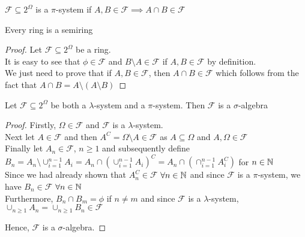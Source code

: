 \begin{definition}[$\pi$-system]
	$\mathcal F \subseteq 2^\Omega$ is a $\pi$-system if $A, B \in \mathcal F \implies A \cap B \in \mathcal F$
\end{definition}

\begin{lemma}
	Every ring is a semiring
\end{lemma}

\begin{proof}
	Let $\mathcal F \subseteq 2^\Omega$ be a ring. \\
	It is easy to see that $\phi \in \mathcal F$ and $B \setminus A \in \mathcal F$ if $A,B \in \mathcal F$ by definition. \\
	We just need to prove that if $A,B \in \mathcal F$, then $A \cap B \in \mathcal F$ which follows from the fact that $A \cap B = A\setminus (A \setminus B)$
\end{proof}

\begin{lemma}
	Let $\mathcal{F} \subseteq 2^\Omega$ be both a $\lambda$-system and a $\pi$-system. Then $\mathcal F$ is a $\sigma$-algebra
\end{lemma}

\begin{proof}
	Firstly, $\Omega \in \mathcal F$ and $\mathcal F$ is a $\lambda$-system. \\
	Next let $A \in \mathcal F$ and then $A^C = \Omega \setminus A \in \mathcal F$ as $A \subseteq \Omega$ and $A, \Omega \in \mathcal F$ \\
	Finally let $A_n \in \mathcal F$, $n \geq 1$ and subsequently define $B_n=A_n \setminus \cup_{i=1}^{n-1} A_i=A_n \cap (\cup_{i=1}^{n-1} A_i)^C= A_n \cap (\cap_{i=1}^{n-1} A_i^C)$ for $n \in \mathbb N$ \\
	Since we had already shown that $A_n^C \in \mathcal F$ $\forall n \in \mathbb N$ and since $\mathcal F$ is a $\pi$-system, we have $B_n \in \mathcal F$ $\forall n \in \mathbb N$ \\
	Furthermore, $B_n \cap B_m = \phi$ if $n \neq m$ and since $\mathcal F$ is a $\lambda$-system, $\cup_{n \geq 1} A_n=\cup_{n \geq 1} B_n \in \mathcal F$
	\vspace{10pt}
	
	Hence, $\mathcal F$ is a $\sigma$-algebra.
\end{proof}